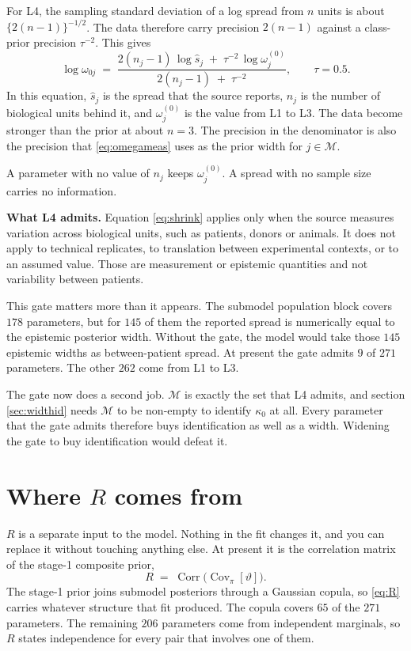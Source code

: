\documentclass[11pt]{article}
\newcommand{\Mset}{\mathcal{M}}
\DeclareMathOperator{\Cov}{Cov}
\DeclareMathOperator{\Corr}{Corr}
\begin{document}
For L4, the sampling standard deviation of a log spread from $n$ units is about
$\{2(n-1)\}^{-1/2}$. The data therefore carry precision $2(n-1)$ against a
class-prior precision $\tau^{-2}$. This gives
\begin{equation}
\log\omega_{0j} \;=\;
\frac{2(n_j-1)\,\log\hat s_j \;+\; \tau^{-2}\,\log\omega^{(0)}_j}
     {2(n_j-1)\;+\;\tau^{-2}},
\qquad \tau=0.5 .
\label{eq:shrink}
\end{equation}
In this equation, $\hat s_j$ is the spread that the source reports, $n_j$ is the
number of biological units behind it, and $\omega^{(0)}_j$ is the value from L1
to L3. The data become stronger than the prior at about $n=3$. The precision in
the denominator is also the precision that \eqref{eq:omegameas} uses as the prior
width for $j\in\Mset$.

A parameter with no value of $n_j$ keeps $\omega^{(0)}_j$. A spread with no
sample size carries no information.

\begin{assumpbox}
\textbf{What L4 admits.} Equation \eqref{eq:shrink} applies only when the source
measures variation across biological units, such as patients, donors or animals.
It does not apply to technical replicates, to translation between experimental
contexts, or to an assumed value. Those are measurement or epistemic quantities
and not variability between patients.

This gate matters more than it appears. The submodel population block covers
$178$ parameters, but for $145$ of them the reported spread is numerically equal
to the epistemic posterior width. Without the gate, the model would take those
$145$ epistemic widths as between-patient spread. At present the gate admits $9$
of $271$ parameters. The other $262$ come from L1 to L3.

The gate now does a second job. $\Mset$ is exactly the set that L4 admits, and
section \ref{sec:widthid} needs $\Mset$ to be non-empty to identify $\kappa_0$
at all. Every parameter that the gate admits therefore buys identification as
well as a width. Widening the gate to buy identification would defeat it.
\end{assumpbox}

\section{Where \texorpdfstring{$R$}{R} comes from}
\label{sec:R}

$R$ is a separate input to the model. Nothing in the fit changes it, and you can
replace it without touching anything else. At present it is the correlation
matrix of the stage-1 composite prior,
\begin{equation}
R \;=\; \Corr\big(\Cov_\pi[\vartheta]\big).
\label{eq:R}
\end{equation}
The stage-1 prior joins submodel posteriors through a Gaussian copula, so
\eqref{eq:R} carries whatever structure that fit produced. The copula covers
$65$ of the $271$ parameters. The remaining $206$ parameters come from
independent marginals, so $R$ states independence for every pair that involves
one of them.
\end{document}
